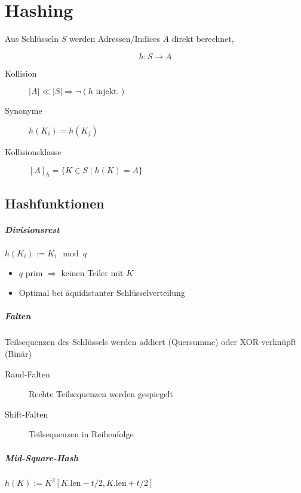\chapter{Hashing}

Aus Schlüsseln $S$ werden Adressen/Indices $A$ direkt berechnet,

$$h: S \rightarrow A$$

\begin{description}
  \item [Kollision] $|A| \ll |S| \Rightarrow \neg (h \text{ injekt.})$

  \item [Synonyme] $h(K_i) = h(K_j)$

  \item [Kollisionsklasse] $[A]_h = \{ K \in S \mid h(K) = A \}$
\end{description}

\section{Hashfunktionen}

\paragraph{Divisionsrest} $h(K_i) := K_i \mod q$

\begin{itemize}
  \item $q$ prim $\Rightarrow$ keinen Teiler mit $K$
  \item Optimal bei äquidistanter Schlüsselverteilung
\end{itemize}

\paragraph{Falten} Teilsequenzen des Schlüssels werden addiert (Quersumme) oder XOR-verknüpft (Binär)

\begin{description}
  \item[Rand-Falten] Rechte Teilsequenzen werden gespiegelt
  \item[Shift-Falten] Teilsequenzen in Reihenfolge
\end{description}

\paragraph{Mid-Square-Hash} $h(K) := K^2[K.\text{len} - t/2, K.\text{len} + t/2]$

